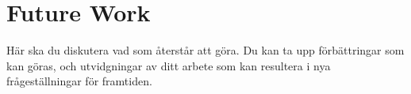 \section{Future Work}

{\color{blue}H\"ar ska du diskutera vad som \r{a}terst\r{a}r att g\"ora. Du kan ta upp f\"orb\"attringar som kan g\"oras, och utvidgningar av ditt arbete som kan resultera i nya fr\r{a}gest\"allningar f\"or framtiden. }
